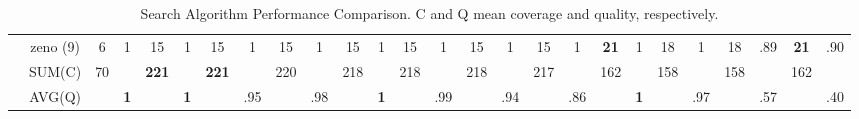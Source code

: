 \begin{table*}
\begin{tabular}{cccccccccccccccccccccccccc}
    \multicolumn{1}{c}{} & zeno (9) & 6 & 1 & 15 & 1 & 15 & 1 & 15 & 1 & 15 & 1 & 15 & 1 & 15 & 1 & 15 & 1 & \textbf{21} & 1 & 18 & 1 & 18 & .89 & \textbf{21} & .90 \\
    \cmidrule(l){2-26}
    \multicolumn{1}{c}{} & SUM(C) & 70 &  & \textbf{221} &  & \textbf{221} &  & 220 &  & 218 &  & 218 &  & 218 &  & 217 &  & 162 &  & 158 &  & 158 &  & 162 &  \\
    \multicolumn{1}{c}{} & AVG(Q) &  & \textbf{1} &  & \textbf{1} &  & .95 &  & .98 &  & \textbf{1} &  & .99 &  & .94 &  & .86 &  & \textbf{1} &  & .97 &  & .57 &  & .40 \\
    \bottomrule
    \end{tabular}
    \caption{Search Algorithm Performance Comparison. C and Q mean coverage and quality, respectively.}
    \label{tab:search_algorithms}
\end{table*}